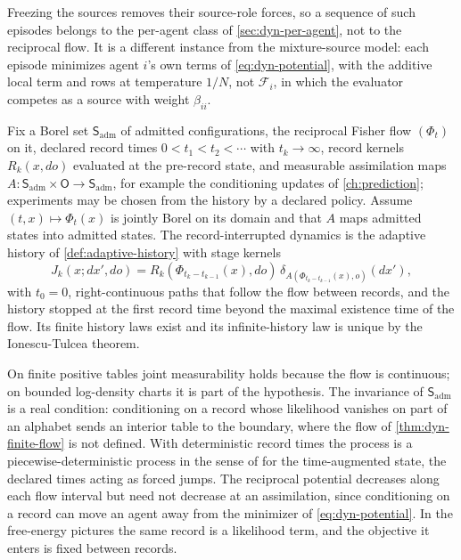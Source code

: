 Freezing the sources removes their source-role forces, so a sequence of such episodes belongs to the per-agent class of \cref{sec:dyn-per-agent}, not to the reciprocal flow. It is a different instance from the mixture-source model: each episode minimizes agent $i$'s own terms of \cref{eq:dyn-potential}, with the additive local term and rows at temperature $1/N$, not $\mathcal F_i$, in which the evaluator competes as a source with weight $\beta_{ii}$.

Fix a Borel set $\mathsf S_{\mathrm{adm}}$ of admitted configurations, the reciprocal Fisher flow $(\Phi_t)$ on it, declared record times $0<t_1<t_2<\cdots$ with $t_k\to\infty$, record kernels $R_k(x,do)$ evaluated at the pre-record state, and measurable assimilation maps $A:\mathsf S_{\mathrm{adm}}\times\mathsf O\to\mathsf S_{\mathrm{adm}}$, for example the conditioning updates of \cref{ch:prediction}; experiments may be chosen from the history by a declared policy. Assume $(t,x)\mapsto\Phi_t(x)$ is jointly Borel on its domain and that $A$ maps admitted states into admitted states. The record-interrupted dynamics is the adaptive history of \cref{def:adaptive-history} with stage kernels
\begin{equation}
 J_k(x;dx',do)=R_k(\Phi_{t_k-t_{k-1}}(x),do)\,\delta_{A(\Phi_{t_k-t_{k-1}}(x),o)}(dx'),
 \label{eq:dyn-record-interrupted}
\end{equation}
with $t_0=0$, right-continuous paths that follow the flow between records, and the history stopped at the first record time beyond the maximal existence time of the flow. Its finite history laws exist and its infinite-history law is unique by the Ionescu-Tulcea theorem.

On finite positive tables joint measurability holds because the flow is continuous; on bounded log-density charts it is part of the hypothesis. The invariance of $\mathsf S_{\mathrm{adm}}$ is a real condition: conditioning on a record whose likelihood vanishes on part of an alphabet sends an interior table to the boundary, where the flow of \cref{thm:dyn-finite-flow} is not defined. With deterministic record times the process is a piecewise-deterministic process in the sense of \citet{Davis1984} for the time-augmented state, the declared times acting as forced jumps. The reciprocal potential decreases along each flow interval but need not decrease at an assimilation, since conditioning on a record can move an agent away from the minimizer of \cref{eq:dyn-potential}. In the free-energy pictures the same record is a likelihood term, and the objective it enters is fixed between records.

